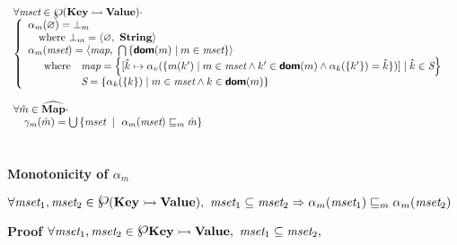$\begin{array}{l}
\forall \emph{mset} \in \poset(\CMap) \cdot \\ 
\left \{
\begin{array}{l}
\alpha_m(\varnothing) = \bot_m \\
\quad \textrm{where } \bot_m = \langle \varnothing,\ \textbf{String} \rangle \\
\alpha_m(\emph{mset}) =
\langle \emph{map},\ \bigcap \left \{ \Dom(m) \mid m \in \emph{mset} \right \} \rangle \\
\quad \begin{array}{ll}\textrm{where} 
& \emph{map} = \left \{
[ \hat{k} \mapsto \alpha_{v}( \{ m(k') \mid m \in \emph{mset} 
\land k' \in \Dom(m) \land \alpha_k(\{k'\}) = \hat{k} \} ) ]
\mid \hat{k} \in \emph{S}  \right \} \\
& \emph{S} = \left \{ 
\alpha_k(\{k\}) \mid m \in \emph{mset} \land k \in \Dom(m) \right \}\\
\end{array}\\
\end{array} \right. \\\\

\forall \hat{m} \in \AMap \cdot \\
\quad \gamma_{m}(\hat{m}) = \bigcup \left \{ \emph{mset} ~\mid~
\alpha_{m}(\emph{mset}) \po_m \hat{m} \right \} \\
\end{array}$\\\\\\
\textbf{Monotonicity of $\alpha_m$}
\begin{center}
$\forall \emph{mset}_1, \emph{mset}_2 \in \poset(\CMap), ~
\emph{mset}_1 \subseteq \emph{mset}_2
\Rightarrow
\alpha_m(\emph{mset}_1) \po_m \alpha_m(\emph{mset}_2)$
\end{center}
\textbf{Proof } 
$\forall \emph{mset}_1, \emph{mset}_2 \in \poset{\CMap},~ 
\emph{mset}_1 \subseteq \emph{mset}_2, ~$
